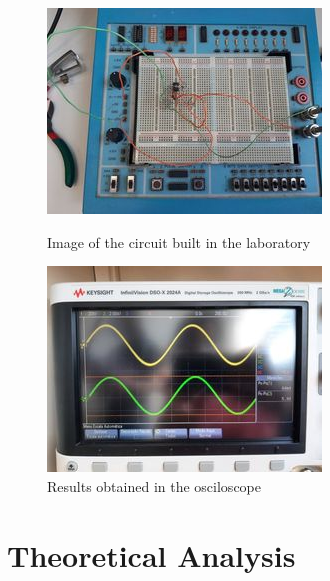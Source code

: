 \begin{figure}[h] \centering
  \begin{minipage}{.5\textwidth}
    \includegraphics[width=.9\textwidth]{lab1.jpg}
    \caption{Image of the circuit built in the laboratory}
    \label{fig:simenv}
    \end{minipage}%
  \begin{minipage}{.5\textwidth}
  \centering
    \includegraphics[width=.9\textwidth]{lab2.jpg}
    \caption{Results obtained in the osciloscope}
    \label{fig:compenv}
      \end{minipage}%
\end{figure}

\section{Theoretical Analysis} \label{sec:analysis}
 
